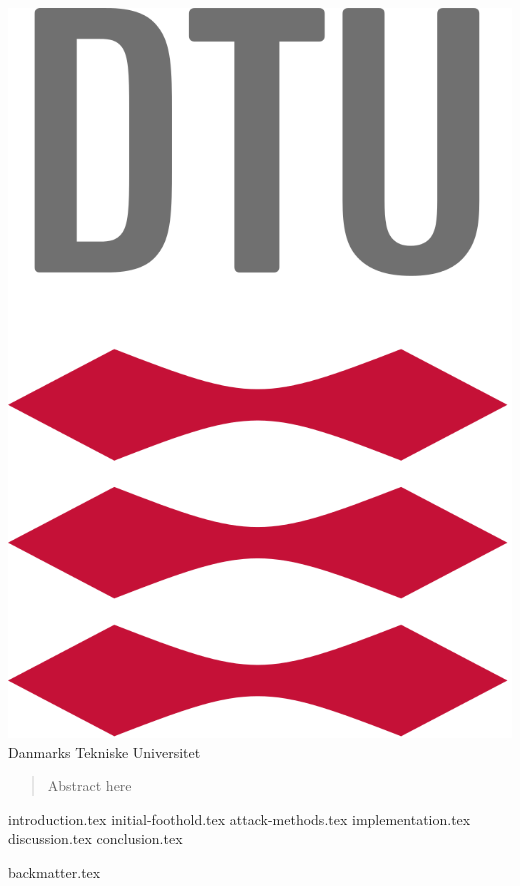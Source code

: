 \documentclass{article}
\begin{document}
\maketitle
\begin{center}
	\vspace{1cm}
	\includegraphics[scale=0.2]{dtulogo}\\
	\LARGE
	Danmarks Tekniske Universitet\\
\end{center}
\newpage


\begin{abstract}
	Abstract here
\end{abstract}
\newpage

\tableofcontents
\newpage

\printglossary[type=\acronymtype,title=Abbreviations]
\newpage


{introduction.tex}
{initial-foothold.tex}
{attack-methods.tex}
{implementation.tex}
{discussion.tex}
{conclusion.tex}

{backmatter.tex}
\end{document}
